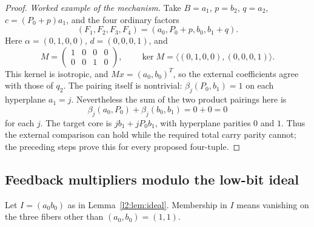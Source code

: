 \documentclass[11pt,a4paper]{article}
\theoremstyle{plain}
\theoremstyle{remark}
\begin{document}
\begin{proof}
\emph{Worked example of the mechanism.}
Take $B=a_1$, $p=b_2$, $q=a_2$, $c=(P_0+p)a_1$, and the four ordinary factors
\[
(F_1,F_2,F_3,F_4)=(a_0,P_0+p,b_0,b_1+q).
\]
Here $\alpha=(0,1,0,0)$, $d=(0,0,0,1)$, and
\[
M=\begin{pmatrix}1&0&0&0\\0&0&1&0\end{pmatrix},\qquad
\ker M=\langle(0,1,0,0),(0,0,0,1)\rangle.
\]
This kernel is isotropic, and $Mx=(a_0,b_0)^T$, so the external coefficients agree with those of $q_2$. The pairing itself is nontrivial: $\beta_j(P_0,b_1)=1$ on each hyperplane $a_1=j$. Nevertheless the sum of the two product pairings here is
\[
\beta_j(a_0,P_0)+\beta_j(b_0,b_1)=0+0=0
\]
for each $j$. The target core is $j b_1+jP_0b_1$, with hyperplane parities $0$ and $1$. Thus the external comparison can hold while the required total carry parity cannot; the preceding steps prove this for every proposed four-tuple.
\end{proof}

\subsection{Feedback multipliers modulo the low-bit ideal}
Let $I=(a_0b_0)$ as in Lemma~\ref{l2:lem:ideal}. Membership in $I$ means vanishing on the three fibers other than $(a_0,b_0)=(1,1)$.
\end{document}
